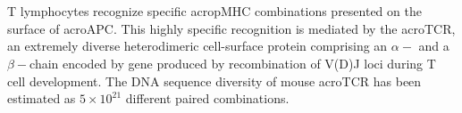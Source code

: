 \documentclass{book}
\begin{document}
	\chapter{}
	
	T lymphocytes recognize specific \gls{acropMHC} combinations presented on the surface of \gls{acroAPC}. This highly specific recognition is mediated by the \gls{acroTCR}, an extremely diverse heterodimeric cell-surface protein comprising an $\alpha- $ and a $ \beta- $chain encoded by gene produced by recombination of V(D)J loci during T cell development. The DNA sequence diversity of mouse \gls{acroTCR} has been estimated as $ 5 \times 10^{21} $ different paired combinations.
	
	\glsaddall
	\printnoidxglossaries 
	
\end{document}
